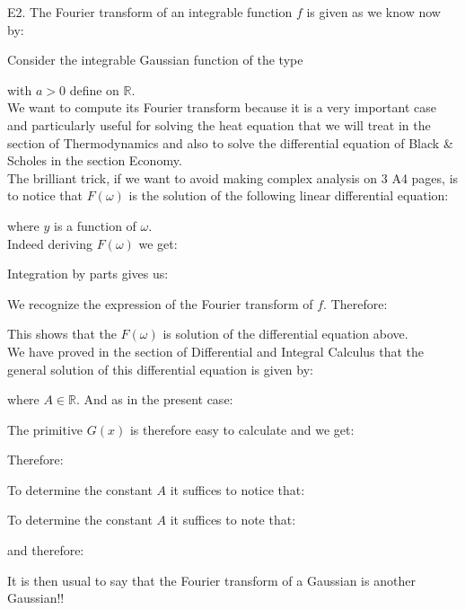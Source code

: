 	\pagebreak
	\begin{tcolorbox}[colframe=black,colback=white,sharp corners]
	E2. The Fourier transform of an integrable function $f$ is given as we know now by:
	
	Consider the integrable Gaussian function of the type \label{fourier transform gaussian function}
	
	with $a>0$ define on $\mathbb{R}$.\\
	
	We want to compute its Fourier transform because it is a very important case and particularly useful for solving the heat equation that we will treat in the section of Thermodynamics and also to solve the differential equation of Black \& Scholes in the section Economy.\\
	
	The brilliant trick, if we want to avoid making complex analysis on $3$ A4 pages, is to notice that $F(\omega)$ is the solution of the following linear differential equation:
	
	where $y$ is a function of $\omega$.\\
	
	Indeed deriving  $F(\omega)$  we get:
	
	Integration by parts gives us:
	
	\end{tcolorbox}
	
	\pagebreak
	\begin{tcolorbox}[colframe=black,colback=white,sharp corners]
	We recognize the expression of the Fourier transform of $f$. Therefore:
	
	This shows that the $F(\omega)$ is solution of the differential equation above.\\
	
	We have proved in the section of Differential and Integral Calculus  that the general solution of this differential equation is given by:
	
	where $A \in \mathbb{R}$. And as in the present case:
	
	The primitive $G (x)$ is therefore easy to calculate and we get:
	
	Therefore:
	
	To determine the constant $A$ it suffices to notice that:
	
	To determine the constant $A$ it suffices to note that:
	
	and therefore:
	
	It is then usual to say that the Fourier transform of a Gaussian is another Gaussian!!
	\end{tcolorbox}
	
